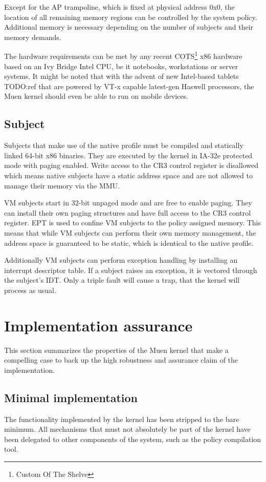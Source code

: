 Except for the AP trampoline, which is fixed at physical address 0x0, the
location of all remaining memory regions can be controlled by the system policy.
Additional memory is necessary depending on the number of subjects and their
memory demands.

The hardware requirements can be met by any recent COTS\footnote{Custom Of The
Shelve} x86 hardware based on an Ivy Bridge Intel CPU, be it notebooks,
workstations or server systems. It might be noted that with the advent of new
Intel-based tablets TODO:ref that are powered by VT-x capable latest-gen Haswell
processors, the Muen kernel should even be able to run on mobile devices.

\subsection{Subject}
Subjects that make use of the native profile must be compiled and statically
linked 64-bit x86 binaries. They are executed by the kernel in IA-32e protected
mode with paging enabled. Write access to the CR3 control register is disallowed
which means native subjects have a static address space and are not allowed to
manage their memory via the MMU.

VM subjects start in 32-bit unpaged mode and are free to enable paging. They can
install their own paging structures and have full access to the CR3 control
register. EPT is used to confine VM subjects to the policy assigned memory. This
means that while VM subjects can perform their own memory management, the
address space is guaranteed to be static, which is identical to the native
profile.

Additionally VM subjects can perform exception handling by installing an
interrupt descriptor table. If a subject raises an exception, it is vectored
through the subject's IDT. Only a triple fault will cause a trap, that the
kernel will process as usual.

\section{Implementation assurance}
This section summarizes the properties of the Muen kernel that make a compelling
case to back up the high robustness and assurance claim of the implementation.

\subsection{Minimal implementation}
The functionality implemented by the kernel has been stripped to the bare
minimum. All mechanisms that must not absolutely be part of the kernel have been
delegated to other components of the system, such as the policy compilation
tool.

